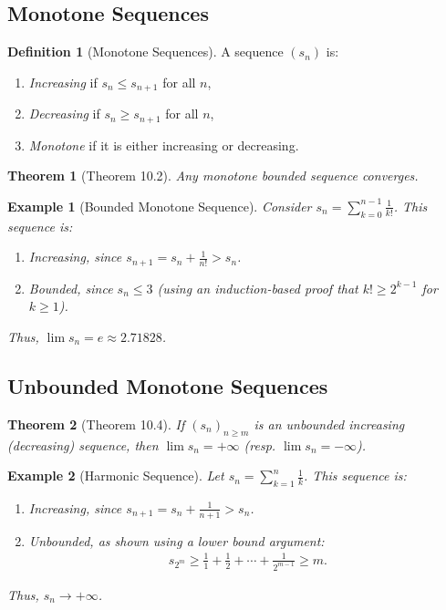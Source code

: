 \documentclass[9pt]{article}
\theoremstyle{definition}
\newtheorem{definition}{Definition}
\theoremstyle{plain}
\newtheorem{theorem}{Theorem}
\newtheorem{example}{Example}
\begin{document}
\subsection*{Monotone Sequences}
\begin{definition}[Monotone Sequences]
A sequence $ (s_n) $ is:
\begin{enumerate}
    \item \textit{Increasing} if $ s_n \leq s_{n+1} $ for all $ n $,
    \item \textit{Decreasing} if $ s_n \geq s_{n+1} $ for all $ n $,
    \item \textit{Monotone} if it is either increasing or decreasing.
\end{enumerate}
\end{definition}

\begin{theorem}[Theorem 10.2]
Any monotone bounded sequence converges.
\end{theorem}

\begin{example}[Bounded Monotone Sequence]
Consider $ s_n = \sum_{k=0}^{n-1} \frac{1}{k!} $. This sequence is:
\begin{enumerate}
    \item Increasing, since $ s_{n+1} = s_n + \frac{1}{n!} > s_n $.
    \item Bounded, since $ s_n \leq 3 $ (using an induction-based proof that $ k! \geq 2^{k-1} $ for $ k \geq 1 $).
\end{enumerate}
Thus, $ \lim s_n = e \approx 2.71828 $.
\end{example}

\subsection*{Unbounded Monotone Sequences}
\begin{theorem}[Theorem 10.4]
If $ (s_n)_{n \geq m} $ is an unbounded increasing (decreasing) sequence, then $ \lim s_n = +\infty $ (resp. $ \lim s_n = -\infty $).
\end{theorem}

\begin{example}[Harmonic Sequence]
Let $ s_n = \sum_{k=1}^n \frac{1}{k} $. This sequence is:
\begin{enumerate}
    \item Increasing, since $ s_{n+1} = s_n + \frac{1}{n+1} > s_n $.
    \item Unbounded, as shown using a lower bound argument:
    \begin{align}
    s_{2^m} \geq \frac{1}{1} + \frac{1}{2} + \cdots + \frac{1}{2^{m-1}} \geq m.
    \end{align}
\end{enumerate}
Thus, $ s_n \to +\infty $.
\end{example}
\end{document}
